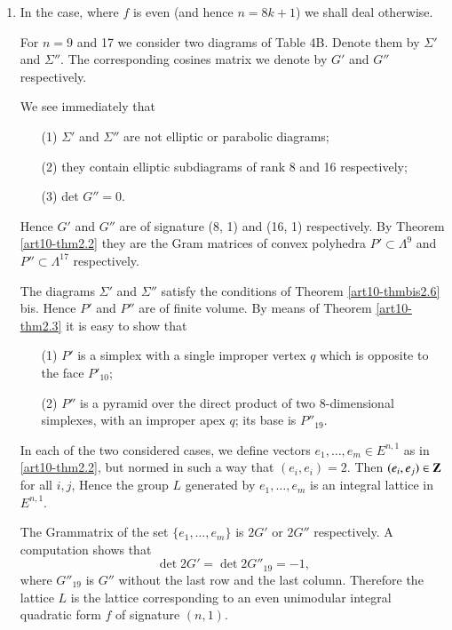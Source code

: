 \begin{enumerate}
\item In the case, where $f$ is even (and hence $n = 8k +1$) we shall deal otherwise.

For $n=9$ and 17 we consider two diagrams of Table 4B. Denote them by $\Sigma'$ and $\Sigma''$. The corresponding cosines matrix we denote by $G'$ and $G''$ respectively.

We see immediately that 
\begin{itemize}
\item[(1)] $\Sigma'$ and $\Sigma''$ are not elliptic or parabolic diagrams;

\item[(2)] they contain elliptic subdiagrams of rank 8 and 16 respectively;

\item[(3)] det $G'' = 0$.
\end{itemize}

Hence $G'$ and $G''$ are of signature (8, 1) and (16, 1) respectively. By Theorem \ref{art10-thm2.2} they are the Gram matrices of convex polyhedra $P' \subset \Lambda^9$ and $P'' \subset \Lambda^{17}$ respectively.

The diagrams $\Sigma'$ and $\Sigma''$ satisfy the conditions of Theorem \ref{art10-thmbis2.6} bis. Hence $P'$ and $P''$ are of finite volume. By means of Theorem \ref{art10-thm2.3} it is easy to show that 
\begin{itemize}
\item[(1)] $P'$ is a simplex with a single improper vertex $q$ which is opposite to the face $P'_{10}$;

\item[(2)] $P''$ is a pyramid over the direct product of two 8-dimensional simplexes, with an improper apex $q$; its base is $P''_{19}$.
\end{itemize}

In each of the two considered cases, we define vectors $e_1, \ldots, e_m \in E^{n,1}$ as in \ref{art10-thm2.2}, but normed in such a way that $(e_i, e_i) =2$. Then $(e_i, e_j) \in \mathbf{Z}$ for all $i, j$, Hence the group $L$ generated by $e_1, \ldots , e_m$ is an integral lattice in $E^{n,1}$.

The Gram\pageoriginale  matrix of the set $\{e_1, \ldots, e_m\}$ is $2G'$ or $2G''$ respectively. A computation shows that
$$
\det 2 G' = \det 2 G''_{19} = - 1,
$$
where $G''_{19}$ is $G''$ without the last row and the last column. Therefore the lattice $L$ is the lattice corresponding to an even unimodular integral quadratic form $f$ of signature $(n,1)$.


\end{enumerate}
